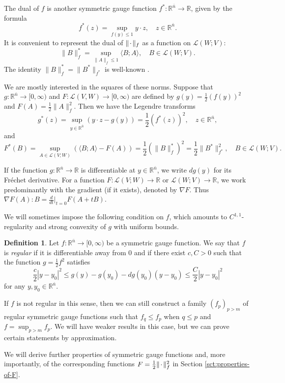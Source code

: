 \documentclass[a4paper]{article}
\newcommand{\R}{\mathbb{R}}
\newcommand{\ndim}{{\bar{n}}}
\newcommand{\Lin}{\mathcal{L}}
\newcommand{\blank}{{\mkern 2mu\cdot\mkern 2mu}}
\newcommand{\pairing}[2]{\langle #1; #2 \rangle}
\theoremstyle{definition}
\newtheorem{definition}[theorem]{Definition}
\theoremstyle{remark}
\begin{document}
The dual of $f$ is another symmetric gauge function $f^* \colon \R^\ndim \to \R$,
given by the formula
\[
f^*(z) = \sup_{f(y) \le 1} y \cdot z, \quad z \in \R^\ndim.
\]
It is convenient to represent the dual of $\|\blank\|_f$ as a function on
$\Lin(W; V)$:
\[
\|B\|_f^* = \sup_{\|A\|_f \le 1} \pairing{B}{A}, \quad B \in \Lin(W; V).
\]
The identity $\|B\|_f^* = \|B^*\|_{f^*}$ is well-known
\cite[pp.\ 439--440]{Horn-Johnson:85}.

We are mostly interested in the squares of these norms. Suppose that $g \colon \R^\ndim \to [0, \infty)$ and
$F \colon \Lin(V, W) \to [0, \infty)$ are defined by $g(y) = \frac{1}{2} (f(y))^2$ and $F(A) = \frac{1}{2} \|A\|_f^2$.
Then we have the Legendre transforms
\[
g^*(z) = \sup_{y \in \R^\ndim} (y \cdot z - g(y)) = \frac{1}{2} (f^*(z))^2, \quad z \in \R^\ndim,
\]
and
\[
F^*(B) = \sup_{A \in \Lin(V; W)} (\pairing{B}{A} - F(A)) = \frac{1}{2} (\|B\|_f^*)^2 = \frac{1}{2}\|B^*\|_{f^*}^2, \quad B \in \Lin(W; V).
\]

If the function $g \colon \R^\ndim \to \R$ is differentiable at $y \in \R^\ndim$, we write $dg(y)$ for its Fr\'echet derivative.
For a function $F \colon \Lin(V; W) \to \R$ or $\Lin(W; V) \to \R$, we work predominantly with the gradient (if it exists),
denoted by $\nabla F$. Thus $\nabla F(A) : B = \frac{d}{dt}|_{t = 0} F(A + tB)$.

We will sometimes impose the following condition on $f$, which amounts to
$C^{1, 1}$-regularity and strong convexity of $g$ with uniform bounds.

\begin{definition} \label{def:regular}
Let $f \colon \R^\ndim \to [0, \infty)$ be a symmetric gauge function.
We say that $f$ is \emph{regular} if it is
differentiable away from $0$ and if there exist $c, C > 0$ such that the function $g = \frac{1}{2} f^2$ satisfies
\begin{equation} \label{eq:Hessian-estimate-g}
\frac{c}{2} |y - y_0|^2 \le g(y) - g(y_0) - dg(y_0)(y - y_0) \le \frac{C}{2} |y - y_0|^2
\end{equation}
for any $y, y_0 \in \R^\ndim$.
\end{definition}

If $f$ is not regular in this sense, then we can still construct
a family $(f_p)_{p > m}$ of regular symmetric gauge functions such that $f_q \le f_p$ when $q \le p$ and $f = \sup_{p > m} f_p$.
We will have weaker results in this case, but we can prove certain
statements by approximation.

We will derive further properties of symmetric gauge functions and, more importantly, of the corresponding functions $F = \frac{1}{2}\|\blank\|_f^2$ in Section \ref{sct:properties-of-F}.
\end{document}
